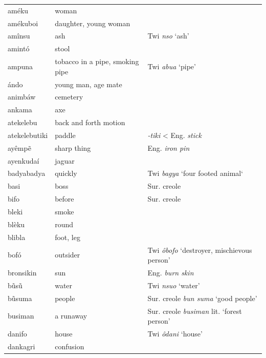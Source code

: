 \begin{longtable}[c]{ p{} p{} p{} }
    améku           & woman         &  \\
    amékuboi        & daughter, young woman%
                                    &  \\
    amînsu          & ash           & Twi \textit{nso} `ash'  \\
    amintó          & stool         &  \\
    ampuna          & tobacco in a pipe, smoking pipe%
                                    & Twi \textit{abua} `pipe'  \\
    ándo            & young man, age mate%
                                    &  \\
    animbáw         & cemetery      &  \\
    ankama          & axe           &  \\
    atekelebu       & back and forth motion%
                                    &  \\
    atekelebutiki   & paddle        & \textit{-tiki} < Eng. \textit{stick}  \\
    ayêmpẽ          & sharp thing   & Eng. \textit{iron pin}  \\
    ayenkudaí       & jaguar        &  \\
    badyabadya      & quickly       & Twi \textit{bagya} `four footed animal`  \\
    basi            & boss          & Sur. creole  \\
    bifo            & before        & Sur. creole  \\
    bleki           & smoke         &  \\
    blèku           & round         &  \\
    blibla          & foot, leg     &  \\
    bofó            & outsider      & Twi \textit{ôbofo} `destroyer, mischievous person'  \\
    bronsikin       & sun           & Eng. \textit{burn skin}  \\
    bũsũ            & water         & Twi \textit{nsuo} `water'  \\
    bũsuma          & people        & Sur. creole \textit{bun suma} `good people'  \\
    busiman         & a runaway     & Sur. creole \textit{busiman} lit. `forest person'  \\
    danifo          & house         & Twi \textit{ôdani} `house'  \\
    dankagri        & confusion     &  \\

\end{longtable}
